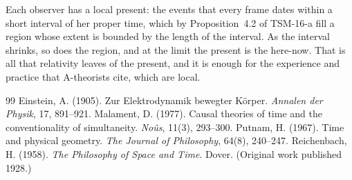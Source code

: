\documentclass{situationist-preprint}
\begin{document}
Each observer has a local present: the events that every frame dates within a short interval of her proper time, which by Proposition~4.2 of TSM-16-a fill a region whose extent is bounded by the length of the interval. As the interval shrinks, so does the region, and at the limit the present is the here-now. That is all that relativity leaves of the present, and it is enough for the experience and practice that A-theorists cite, which are local.

\begin{thebibliography}{99}\small
{} Einstein, A. (1905). Zur Elektrodynamik bewegter K\"orper. \emph{Annalen der Physik}, 17, 891--921.
 Malament, D. (1977). Causal theories of time and the conventionality of simultaneity. \emph{No\^us}, 11(3), 293--300.
 Putnam, H. (1967). Time and physical geometry. \emph{The Journal of Philosophy}, 64(8), 240--247.
 Reichenbach, H. (1958). \emph{The Philosophy of Space and Time}. Dover. (Original work published 1928.)
\end{thebibliography}
\end{document}
